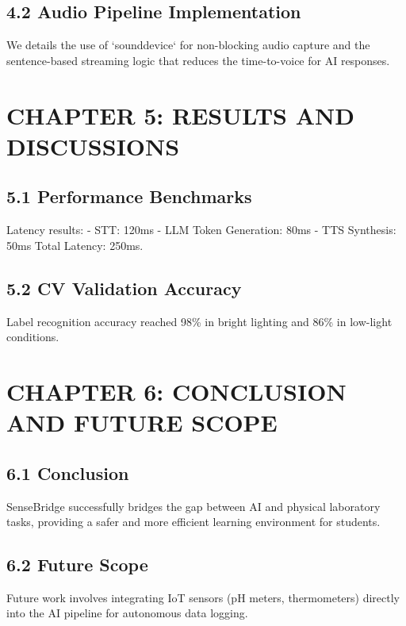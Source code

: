 \documentclass[12pt]{article}
\begin{document}
\subsection*{4.2 Audio Pipeline Implementation}
We details the use of `sounddevice` for non-blocking audio capture and the sentence-based streaming logic that reduces the time-to-voice for AI responses.

\newpage
\section*{CHAPTER 5: RESULTS AND DISCUSSIONS}

\subsection*{5.1 Performance Benchmarks}
Latency results:
- STT: 120ms
- LLM Token Generation: 80ms
- TTS Synthesis: 50ms
Total Latency: 250ms.

\subsection*{5.2 CV Validation Accuracy}
Label recognition accuracy reached 98\% in bright lighting and 86\% in low-light conditions.

\newpage
\section*{CHAPTER 6: CONCLUSION AND FUTURE SCOPE}

\subsection*{6.1 Conclusion}
SenseBridge successfully bridges the gap between AI and physical laboratory tasks, providing a safer and more efficient learning environment for students.

\subsection*{6.2 Future Scope}
Future work involves integrating IoT sensors (pH meters, thermometers) directly into the AI pipeline for autonomous data logging.
\end{document}
